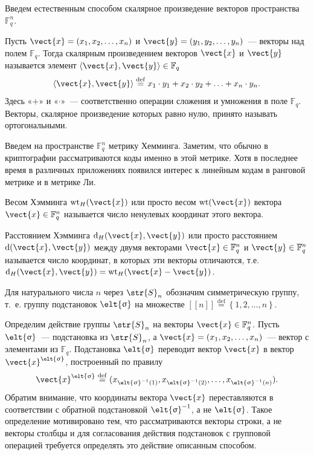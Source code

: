 \documentclass[12pt]{extreport}
\begin{document}
Введем естественным способом скалярное произведение векторов пространства \(\mathbb{F}^n_q\).

Пусть \(\vect{x}=(x_1,x_2,\ldots, x_n)\) и \(\vect{y}=(y_1,y_2,\ldots,y_n)\)~--- векторы над полем \(\mathbb{F}_q\).
Тогда скалярным произведением векторов \(\vect{x}\) и \(\vect{y}\) называется элемент \(\left\langle \vect{x}, \vect{y} \right\rangle\in \mathbb{F}_q\)
\[
\left\langle\vect{x}, \vect{y}\right\rangle
\stackrel{\mathrm{def}}{=} x_1\cdot y_1 + x_2\cdot y_2 + \ldots + x_n\cdot y_n.
\]
Здесь «\(+\)» и «\(\cdot\)»~--- соответственно операции сложения и умножения в поле \(\mathbb{F}_q\).
Векторы, скалярное произведение которых равно нулю, принято называть ортогональными.

Введем на пространстве \(\mathbb{F}^n_q\) метрику Хемминга.
Заметим, что обычно в криптографии рассматриваются коды именно в этой метрике.
Хотя в последнее время в различных приложениях появился интерес к линейным кодам в ранговой метрике и в метрике Ли.

Весом Хэмминга \(\operatorname{wt}_H(\vect{x})\) или просто весом \(\operatorname{wt}(\vect{x})\) вектора \(\vect{x}\in \mathbb{F}^n_q\) называется число ненулевых координат этого вектора.

Расстоянием Хэмминга \(\operatorname{d}_H(\vect{x},\vect{y})\) или просто расстоянием \(\operatorname{d}(\vect{x},\vect{y})\) между двумя векторами \(\vect{x}\in \mathbb{F}^n_q\) и \(\vect{y}\in \mathbb{F}^n_q\) называется число координат, в которых эти векторы отличаются, т.е. \(\operatorname{d}_H(\vect{x},\vect{y})=\operatorname{wt}_H(\vect{x}-\vect{y})\).

Для натурального числа \(n\) через \(\str{S}_{n}\) обозначим симметрическую группу, т.~е. группу подстановок \(\elt{\sigma}\) на множестве \([\![n]\!] \stackrel{\mathrm{def}}{=} \left\{1,2, \dotsc, n\right\}\).

Определим действие группы \(\str{S}_{n}\) на векторы \(\vect{x}\in \mathbb{F}^{n}_{q}\).
Пусть \(\elt{\sigma}\)~--- подстановка из \(\str{S}_{n}\), а \(\vect{x}=(x_1,x_2,\ldots,x_n)\)~--- вектор с элементами из \(\mathbb{F}_q\).
Подстановка \(\elt{\sigma}\) переводит вектор \(\vect{x}\) в вектор \(\vect{x}^{\elt{\sigma}}\), построенный по правилу
\[\vect{x}^{\elt{\sigma}}\stackrel{\mathrm{def}}{=}(x_{\elt{\sigma}^{-1}(1)},x_{\elt{\sigma}^{-1}(2)},\ldots,x_{\elt{\sigma}^{-1}(n)}).\]
Обратим внимание, что координаты вектора \(\vect{x}\) переставляются в соответствии с обратной подстановкой \(\elt{\sigma}^{-1}\), а не \(\elt{\sigma}\).
Такое определение мотивировано тем, что рассматриваются векторы строки, а не векторы столбцы и для согласования действия подстановок с групповой операцией требуется определять это действие описанным способом.
\end{document}
